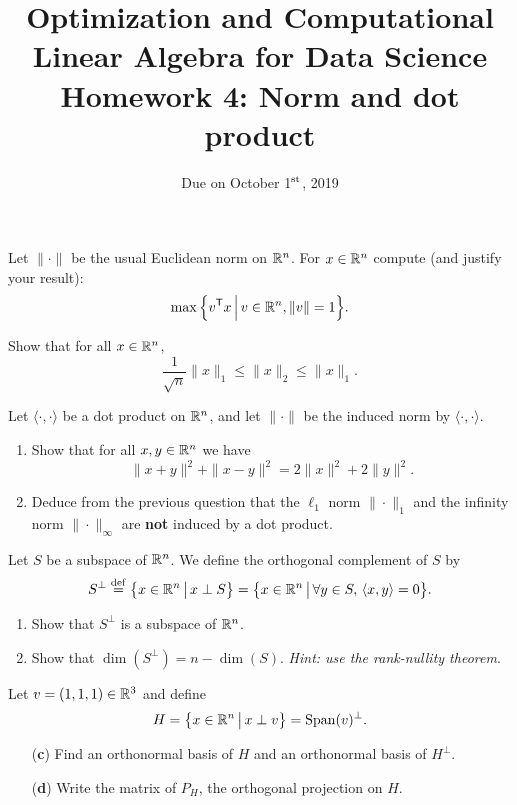 \documentclass[11pt,nocut]{article}
\title{\vspace{-3.0cm}%
	Optimization and Computational Linear Algebra for Data Science\\
Homework 4: Norm and dot product}
\date{\vspace{-1cm}Due on October 1$^{\rm st}$, 2019}
\begin{document}
\maketitle




\begin{problem}[2 points]
	Let $\| \cdot \|$ be the usual Euclidean norm on $\mathbb{R}^n$.
	For $x \in \mathbb{R}^n$ compute (and justify your result):
	$$
	\max \Big\{ v^{{\sf T}} x \, \Big| \, v \in \mathbb{R}^n, \|v\|=1 \Big\}.
$$
\end{problem}

\vspace{1mm} 

\begin{problem}[2 points]
	Show that for all $x \in \mathbb{R}^n$,
	$$
	\frac{1}{\sqrt{n}} \|x\|_1 \leq \|x\|_2 \leq \|x\|_1.
	$$
\end{problem}

\vspace{1mm}

\begin{problem}[2 points]
	Let $\langle \cdot, \cdot \rangle$ be a dot product on $\mathbb{R}^n$, and let $\| \cdot \|$ be the induced norm by $\langle \cdot, \cdot \rangle$.
	\begin{enumerate}[label=\normalfont(\textbf{\alph*})]
		\item Show that for all $x,y \in \mathbb{R}^n$ we have
			$$
			\|x+y\|^2 + \|x-y\|^2 = 2 \|x\|^2 + 2 \|y\|^2.
			$$
		\item Deduce from the previous question that the $\ell_1$ norm $\| \cdot \|_1$ and the infinity norm $\| \cdot \|_{\infty}$ are \textbf{not} induced by a dot product.
	\end{enumerate}
\end{problem}

\vspace{1mm}

\begin{problem}[4 points]
	Let $S$ be a subspace of $\mathbb{R}^n$. We define the orthogonal complement of $S$ by
	$$
	S^{\perp} \overset{\rm def}{=} 
	\big\{ x \in \mathbb{R}^n \, \big| \, x \perp S \big\} = 
	\big\{ x \in \mathbb{R}^n \, \big| \, \forall y \in S, \, \langle x,y \rangle = 0 \big\}.
	$$
	\begin{enumerate}[label=\normalfont(\textbf{\alph*})]
		\item Show that $S^{\perp}$ is a subspace of $\mathbb{R}^n$.
		\item Show that $\dim(S^{\perp}) = n - \dim(S)$. \textit{Hint: use the rank-nullity theorem}.
	\end{enumerate}
	Let $v = (1,1,1) \in \mathbb{R}^3$ and define
	$$
	H = 
	\big\{ x \in \mathbb{R}^n \, \big| \, x \perp v \big\} = {{\rm Span}}(v)^{\perp}.
	$$
	\begin{enumerate}[label=\normalfont(\textbf{\alph*})]
		\item[\normalfont(\textbf{c})] Find an orthonormal basis of $H$ and an orthonormal basis of $H^{\perp}$.
		\item[\normalfont(\textbf{d})] Write the matrix of $P_H$, the orthogonal projection on $H$.
	\end{enumerate}
\end{problem}
\end{document}
